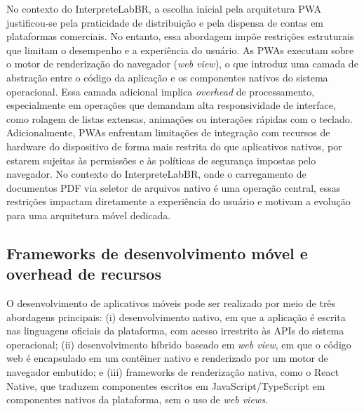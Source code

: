 \documentclass[12pt]{article}
\begin{document}
No contexto do InterpreteLabBR, a escolha inicial pela arquitetura PWA justificou-se pela praticidade de distribuição e pela dispensa de contas em plataformas comerciais. No entanto, essa abordagem impõe restrições estruturais que limitam o desempenho e a experiência do usuário. As PWAs executam sobre o motor de renderização do navegador (\emph{web view}), o que introduz uma camada de abstração entre o código da aplicação e os componentes nativos do sistema operacional. Essa camada adicional implica \emph{overhead} de processamento, especialmente em operações que demandam alta responsividade de interface, como rolagem de listas extensas, animações ou interações rápidas com o teclado. Adicionalmente, PWAs enfrentam limitações de integração com recursos de hardware do dispositivo de forma mais restrita do que aplicativos nativos, por estarem sujeitas às permissões e às políticas de segurança impostas pelo navegador. No contexto do InterpreteLabBR, onde o carregamento de documentos PDF via seletor de arquivos nativo é uma operação central, essas restrições impactam diretamente a experiência do usuário e motivam a evolução para uma arquitetura móvel dedicada.

\subsection{Frameworks de desenvolvimento móvel e overhead de recursos}

O desenvolvimento de aplicativos móveis pode ser realizado por meio de três abordagens principais: (i) desenvolvimento nativo, em que a aplicação é escrita nas linguagens oficiais da plataforma, com acesso irrestrito às APIs do sistema operacional; (ii) desenvolvimento híbrido baseado em \emph{web view}, em que o código web é encapsulado em um contêiner nativo e renderizado por um motor de navegador embutido; e (iii) frameworks de renderização nativa, como o React Native, que traduzem componentes escritos em JavaScript/TypeScript em componentes nativos da plataforma, sem o uso de \emph{web views}.
\end{document}
